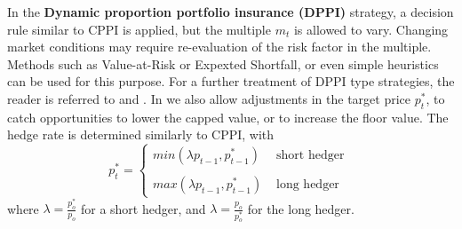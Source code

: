 In the \textbf{Dynamic proportion portfolio insurance (DPPI)} strategy, a decision rule similar to CPPI is applied, but the multiple $m_t$ is allowed to vary. Changing market conditions may require re-evaluation of the risk factor in the multiple. Methods such as Value-at-Risk or Expexted Shortfall, or even simple heuristics can be used for this purpose. For a further treatment of DPPI type strategies, the reader is referred to \citet{lee2008new} and \citet{chen2008dynamic}. In  we also allow adjustments in the target price $p^*_t$, to catch opportunities to lower the capped value, or to increase the floor value. The hedge rate is determined similarly to CPPI, with
\begin{equation}
p^*_t =
\begin{cases}
min(\lambda p_{t-1},p^*_{t-1}) & \text{ short hedger }\\
\\
max(\lambda p_{t-1},p^*_{t-1}) & \text{ long hedger }
\end{cases}
\end{equation}
where $\lambda = \frac{p^*_o}{p_o}$ for a short hedger, and $\lambda = \frac{p_o}{p^*_o}$ for the long hedger.

